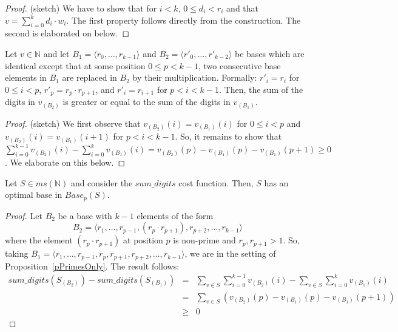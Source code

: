 \documentclass[envcountsame]{llncs}
\newcommand\tuple[1]{\langle #1 \rangle}
\newcommand{\Base}{\mathit{Base}}
\newcommand{\intMultiSet}{\mathit{ms(\mathbb{N})}}
\newcommand{\sumDigits}{\mathit{sum\_digits}}
\begin{document}
\begin{proof}(sketch)
  We have to show that for $i<k$, $0\leq d_i<r_i$ and that 
  $v=\sum_{i=0}^{k} d_i\cdot w_i$. The first property follows directly
  from the construction. The second is elaborated on below.
\end{proof}



\begin{proposition}
\label{pPrimesOnly}
Let $v \in \mathbb{N}$ and let $B_1 = \tuple{r_0,\ldots,r_{k-1}}$ and
$B_2 = \tuple{r'_0,\ldots,r'_{k-2}}$ be bases which are identical
except that at some position $0\leq p<k-1$, two consecutive base
elements in $B_1$ are replaced in $B_2$ by their
multiplication. Formally:
$r'_i=r_i$ for $0\leq i < p$, 
 $r'_{p}=r_p \cdot r_{p+1}$, and
 $r'_i=r_{i+1}$ for $p<i<k-1$.
Then, the sum of the digits in $v_{(B_2)}$ is greater or equal to the
sum of the digits in $v_{(B_1)}$.
\end{proposition}

\begin{proof}(sketch)
   We first observe that 
	$v_{(B_2)}(i)=v_{(B_1)}(i)$  for $0 \leq i < p$   and 
        $v_{(B_2)}(i)=v_{(B_1)}(i+1)$ for $p< i<k-1$.
   So, it remains to show that 
	$ \sum_{i=0}^{k-1}v_{(B_2)}(i) - \sum_{i=0}^{k}v_{(B_1)}(i)= 
                          v_{(B_2)}(p) -v_{(B_1)}(p)-v_{(B_1)}(p+1) \geq 0$.
   We elaborate on this below.
\end{proof}



\noindent{}
Let $S \in \intMultiSet$ and consider the $\sumDigits$ cost
   function. Then, $S$ has an optimal base in $\Base_p(S)$.


\begin{proof}
  Let $B_2$ be a base with $k-1$ elements of the form
\[
    B_2 = \tuple{r_1,\ldots,r_{p-1},(r_p\cdot r_{p+1}),
                  r_{p+2},\ldots,r_{k-1}}
\]
  where the element $(r_p\cdot r_{p+1})$ at position $p$
  is non-prime and $r_p, r_{p+1} > 1$.
So, taking $B_1= \tuple{r_1,\ldots,r_{p-1},r_p,r_{p+1},
                  r_{p+2},\ldots,r_{k-1}}$, we are in the  setting of
  Proposition~\ref{pPrimesOnly}.
The result follows:
  \begin{eqnarray*}
  \sumDigits(S_{(B_2)}) - \sumDigits(S_{(B_1)}) &=& 
     \sum_{v \in S}  \sum_{i=0}^{k-1}v_{(B_2)}(i)- \sum_{v \in S}
     \sum_{i=0}^{k}v_{(B_1)}(i)\\ 
  &=& \sum_{v \in S} ( v_{(B_2)}(p) - v_{(B_1)}(p)- v_{(B_1)}(p+1) )\\
  &\geq& 0    
  \end{eqnarray*}
\end{proof}
\end{document}

